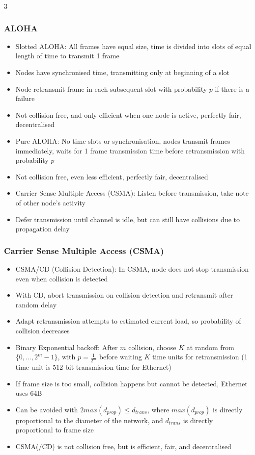 \documentclass[10pt, landscape]{article}
\begin{document}
\begin{multicols*}{3}
\subsubsection{ALOHA}
\begin{itemize}
    \item Slotted ALOHA: All frames have equal size, time is divided into slots of equal length of time to transmit 1 frame
    \item Nodes have synchronised time, transmitting only at beginning of a slot
    \item Node retransmit frame in each subsequent slot with probability $p$ if there is a failure
    \item Not collision free, and only efficient when one node is active, perfectly fair, decentralised
    \item Pure ALOHA: No time slots or synchronisation, nodes transmit frames immediately, waits for 1 frame transmission time before retransmission with probability $p$
    \item Not collision free, even less efficient, perfectly fair, decentralised
    \item Carrier Sense Multiple Access (CSMA): Listen before transmission, take note of other node's activity
    \item Defer transmission until channel is idle, but can still have collisions due to propagation delay
\end{itemize}

\subsubsection{Carrier Sense Multiple Access (CSMA)}
\begin{itemize}
    \item CSMA/CD (Collision Detection): In CSMA, node does not stop transmission even when collision is detected
    \item With CD, abort transmission on collision detection and retransmit after random delay
    \item Adapt retransmission attempts to estimated current load, so probability of collision decreases
    \item Binary Exponential backoff: After $m$ collision, choose $K$ at random from $\{0,..., 2^m-1\}$, with $p=\frac{1}{2^m}$ before waiting $K$ time units for retransmission (1 time unit is 512 bit transmission time for Ethernet)
    \item If frame size is too small, collision happens but cannot be detected, Ethernet uses 64B
    \item Can be avoided with $2max(d_{prop})\leq d_{trans}$, where $max(d_{prop})$ is directly proportional to the diameter of the network, and $d_{trans}$ is directly proportional to frame size
    \item CSMA(/CD) is not collision free, but is efficient, fair, and decentralised
\end{itemize}


\end{multicols*}
\end{document}
